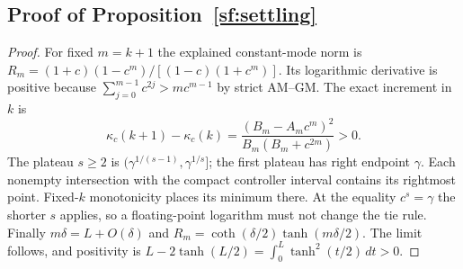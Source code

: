 \subsection{Proof of Proposition~\ref{sf:settling}}
\begin{proof}
For fixed $m=k+1$ the explained constant-mode norm is
$R_m=(1+c)(1-c^m)/[(1-c)(1+c^m)]$.
Its logarithmic derivative is positive because
$\sum_{j=0}^{m-1}c^{2j}>mc^{m-1}$ by strict AM--GM.
The exact increment in $k$ is
\[
\kappa_c(k+1)-\kappa_c(k)
=\frac{(B_m-A_mc^m)^2}{B_m(B_m+c^{2m})}>0.
\]
The plateau $s\ge2$ is $(\gamma^{1/(s-1)},\gamma^{1/s}]$;
the first plateau has right endpoint $\gamma$.
Each nonempty intersection with the compact controller interval contains its
rightmost point. Fixed-$k$ monotonicity places its minimum there.
At the equality $c^s=\gamma$ the shorter $s$ applies, so a floating-point
logarithm must not change the tie rule.
Finally $m\delta=L+O(\delta)$ and
$R_m=\coth(\delta/2)\tanh(m\delta/2)$.
The limit follows, and positivity is
$L-2\tanh(L/2)=\int_0^L\tanh^2(t/2)\,dt>0$.
\end{proof}
